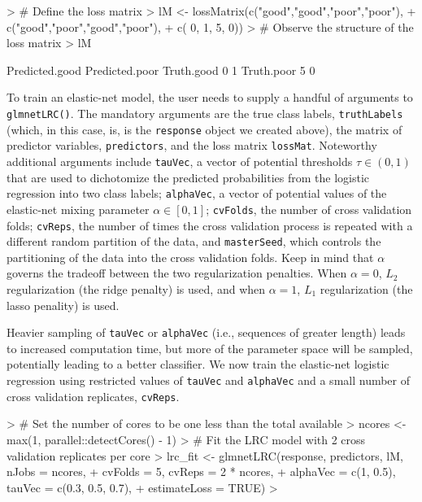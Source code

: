 \documentclass{article}
\begin{document}
\begin{Schunk}
\begin{Sinput}
> # Define the loss matrix
> lM <- lossMatrix(c("good","good","poor","poor"),
+                  c("good","poor","good","poor"),
+                  c(     0,     1,     5,     0))
> # Observe the structure of the loss matrix
> lM
\end{Sinput}
\begin{Soutput}
           Predicted.good Predicted.poor
Truth.good              0              1
Truth.poor              5              0
\end{Soutput}
\end{Schunk}

To train an elastic-net model, the user needs to supply a handful of arguments to {\tt glmnetLRC()}. 
The mandatory arguments are the true class labels, {\tt truthLabels} (which, in this case, is, is the {\tt response} 
object we created above), the matrix of predictor variables, {\tt predictors}, 
and the loss matrix {\tt lossMat}. Noteworthy additional arguments include {\tt tauVec}, a vector of potential 
thresholds $\tau \in (0, 1)$ that are used to dichotomize the predicted probabilities from the logistic regression 
into two class labels; {\tt alphaVec}, a vector of potential values of the elastic-net mixing parameter 
$\alpha \in [0, 1]$; {\tt cvFolds}, the number of cross validation folds; {\tt cvReps}, the number of times
the cross validation process is repeated with a different random partition of the data, and {\tt masterSeed}, which controls 
the partitioning of the data into the cross validation folds. Keep in mind that $\alpha$ governs the tradeoff between 
the two regularization penalties. When $\alpha = 0$, $L_2$ regularization (the ridge penalty) is used,
and when $\alpha = 1$, $L_1$ regularization (the lasso penality) is used.

Heavier sampling of {\tt tauVec} or {\tt alphaVec} (i.e., sequences of greater length) leads to 
increased computation time, but more of the parameter space will be sampled, potentially leading to a better 
classifier.  We now train the elastic-net logistic regression using restricted values of {\tt tauVec} and 
{\tt alphaVec} and a small number of cross validation replicates, {\tt cvReps}.
\begin{Schunk}
\begin{Sinput}
> # Set the number of cores to be one less than the total available
> ncores <- max(1, parallel::detectCores() - 1)
> # Fit the LRC model with 2 cross validation replicates per core
> lrc_fit <- glmnetLRC(response, predictors, lM, nJobs = ncores,
+                      cvFolds = 5, cvReps = 2 * ncores,
+                      alphaVec = c(1, 0.5), tauVec = c(0.3, 0.5, 0.7),
+                      estimateLoss = TRUE)
> 
\end{Sinput}
\end{Schunk}
\end{document}
